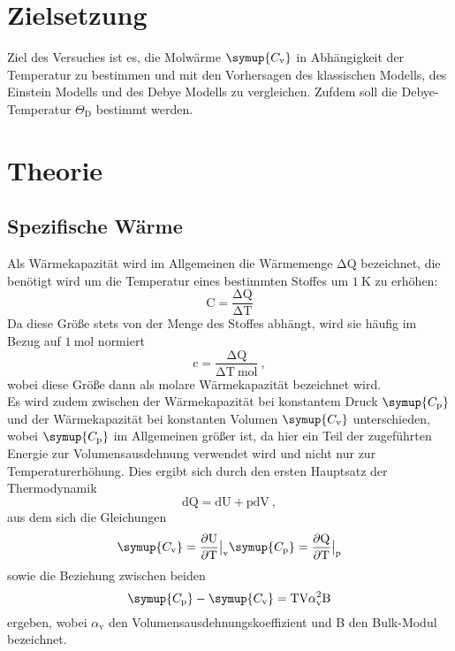 \section{Zielsetzung}
Ziel des Versuches ist es, die Molwärme $\symup{C_{\text{v}}}$ in Abhängigkeit der
Temperatur zu bestimmen und mit den Vorhersagen des klassischen Modells, des Einstein
Modells und des Debye Modells zu vergleichen. Zufdem soll die Debye-Temperatur
$\Theta_{\text{D}}$ bestimmt werden.

\section{Theorie}
\subsection{Spezifische Wärme}
Als Wärmekapazität wird im Allgemeinen die Wärmemenge $\increment \text{Q}$ bezeichnet,
die benötigt wird um
die Temperatur eines
bestimmten Stoffes um $\SI{1}{\kelvin}$ zu erhöhen:
\begin{equation}
  \text{C} = \frac{\increment \text{Q}}{\increment \text{T}}
  \label{eqn:warm}
\end{equation}
Da diese Größe stets von der Menge des Stoffes abhängt, wird sie häufig im
Bezug auf $\SI{1}{\mol}$ normiert
\begin{equation}
  \text{c} = \frac{\increment \text{Q}}{\increment \text{T} \: \text{mol}} \: ,
  \label{eqn:cmol}
\end{equation}
wobei diese Größe dann als molare Wärmekapazität bezeichnet wird.  \\
Es wird zudem zwischen der Wärmekapazität bei konstantem Druck $\symup{C_{\text{p}}}$ und der Wärmekapazität bei
konstanten Volumen $\symup{C_{\text{v}}}$ unterschieden, wobei $\symup{C_{\text{p}}}$
im Allgemeinen größer ist, da hier ein Teil der zugeführten Energie zur Volumensausdehnung verwendet
wird und nicht nur zur Temperaturerhöhung.
Dies ergibt sich durch den ersten Hauptsatz der Thermodynamik
\begin{equation}
  \text{dQ} = \text{dU} + \text{pdV} \: ,
  \label{eqn:hs1}
\end{equation}
aus dem sich die Gleichungen
\begin{equation}
  \symup{C_{\text{v}}} = \frac{\partial\text{U}}{\partial\text{T}}\bigr|_{\text{v}} \\
  \symup{C_{\text{p}}} = \frac{\partial\text{Q}}{\partial\text{T}}\bigr|_{\text{p}}
  \label{eqn:cc}
\end{equation}
sowie die Beziehung zwischen beiden
\begin{equation}
  \symup{C_{\text{p}}}-\symup{C_{\text{v}}}=\text{TV}\alpha_{\text{v}}^2\text{B}
  \label{eqn:cpcv}
\end{equation}
ergeben, wobei $\alpha_{\text{v}}$ den Volumensausdehnungskoeffizient und B den Bulk-Modul
bezeichnet.


